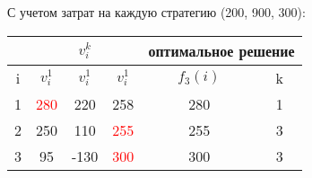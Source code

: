 \documentclass[14pt,a4paper,report]{report}
\begin{document}
С учетом затрат на каждую стратегию (200, 900, 300):

\begin{table}[h!]
	\centering
	\bgroup
	\def\arraystretch{1}
	\begin{tabular}{ | c | c | c | c | c | c | }
	\hline
		  & \multicolumn{3}{c|}{$v_i^k$ }&   \multicolumn{2}{c|}{оптимальное решение} \\ \hline
		i & $ v_i^1 $ & $ v_i^1 $  & $ v_i^1 $ & $ f_3(i) $ & k \\ \hline
		1 & \textcolor{red}{280} & 220 & 258 & 280 & 1\\ \hline
		2 & 250 & 110 & \textcolor{red}{255} & 255 & 3\\ \hline
		3 & 95 & -130 & \textcolor{red}{300} & 300 & 3\\ \hline
	\end{tabular}
	\egroup
\end{table}
\end{document}
